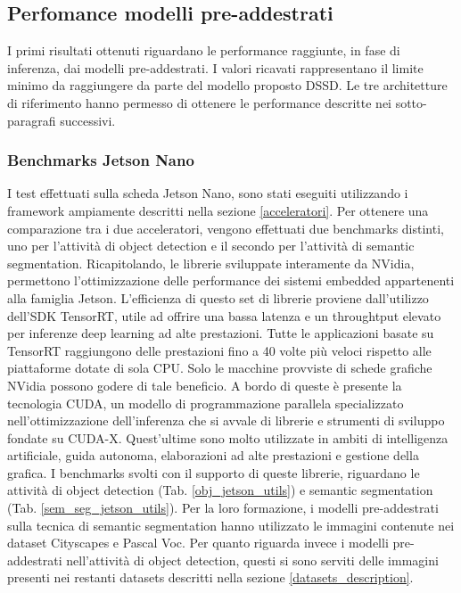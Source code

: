 \subsection{Perfomance modelli pre-addestrati}
I primi risultati ottenuti riguardano le performance raggiunte, in fase di inferenza, dai modelli pre-addestrati. I valori ricavati rappresentano il limite minimo da raggiungere da parte del modello proposto DSSD. Le tre architetture di riferimento hanno permesso di ottenere le performance descritte nei sotto-paragrafi successivi.

\subsubsection{Benchmarks Jetson Nano}
I test effettuati sulla scheda Jetson Nano, sono stati eseguiti utilizzando i framework ampiamente descritti nella sezione \ref{acceleratori}.
Per ottenere una comparazione tra i due acceleratori, vengono effettuati due benchmarks distinti, uno per l'attività di object detection e il secondo per l'attività di semantic segmentation.
Ricapitolando, le librerie sviluppate interamente da NVidia, permettono l'ottimizzazione delle performance dei sistemi embedded appartenenti alla famiglia Jetson. L'efficienza di questo set di librerie proviene dall'utilizzo dell'SDK TensorRT, utile ad offrire una bassa latenza e un throughtput elevato per inferenze deep learning ad alte prestazioni. Tutte le applicazioni basate su TensorRT raggiungono delle prestazioni fino a 40 volte più veloci rispetto alle piattaforme dotate di sola CPU. Solo le macchine provviste di schede grafiche NVidia possono godere di tale beneficio. A bordo di queste è presente la tecnologia CUDA, un modello di programmazione parallela specializzato nell'ottimizzazione dell'inferenza che si avvale di librerie e strumenti di sviluppo fondate su CUDA-X. Quest'ultime sono molto utilizzate  in ambiti di intelligenza artificiale, guida autonoma, elaborazioni ad alte prestazioni e gestione della grafica. 
I benchmarks svolti con il supporto di queste librerie, riguardano le attività di object detection (Tab. \ref{obj_jetson_utils}) e semantic segmentation (Tab. \ref{sem_seg_jetson_utils}).
Per la loro formazione, i modelli pre-addestrati sulla tecnica di semantic segmentation hanno utilizzato le immagini contenute nei dataset Cityscapes e Pascal Voc. Per quanto riguarda invece i modelli pre-addestrati nell'attività di object detection, questi si sono serviti delle immagini presenti nei restanti datasets descritti nella sezione \ref{datasets_description}.
